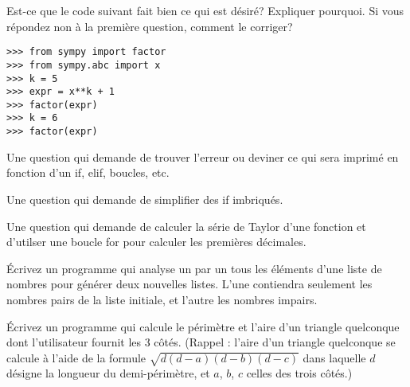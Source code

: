 \begin{exercice}
Est-ce que le code suivant fait bien ce qui est désiré? Expliquer pourquoi.
Si vous répondez non à la première question, comment le corriger?
\begin{verbatim}
>>> from sympy import factor
>>> from sympy.abc import x
>>> k = 5
>>> expr = x**k + 1
>>> factor(expr)
>>> k = 6
>>> factor(expr)
\end{verbatim}
\end{exercice}


\begin{question}
    Une question qui demande de trouver l'erreur ou deviner ce qui sera
    imprimé en fonction d'un if, elif, boucles, etc.
\end{question}

\begin{question}
    Une question qui demande de simplifier des if imbriqués.
\end{question}

\begin{question}
    Une question qui demande de calculer la série de Taylor d'une fonction et
    d'utilser une boucle for pour calculer les premières décimales.
\end{question}

\begin{question}
Écrivez un programme qui analyse un par un tous les éléments d’une liste de
nombres pour générer deux nouvelles listes. L’une contiendra seulement les
nombres pairs de la liste initiale, et l’autre les nombres impairs.
\end{question}

\begin{question}
Écrivez un programme qui calcule le périmètre et l’aire d’un triangle quelconque
dont l’utilisateur fournit les 3 côtés.
(Rappel : l’aire d’un triangle quelconque se calcule à l’aide de la formule
$\sqrt{d(d-a)(d-b)(d-c)}$ dans laquelle $d$ désigne la longueur du
demi-périmètre, et $a$, $b$, $c$ celles des trois côtés.)
\end{question}

